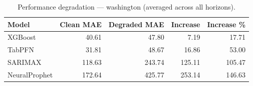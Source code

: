 \begin{table}[h]
\centering
\caption{Performance degradation — washington (averaged across all horizons).}
\label{tab:degradation_summary_washington}
\begin{tabular}{lrrrr}
\toprule
Model & Clean MAE & Degraded MAE & Increase & Increase \% \\
\midrule
XGBoost & 40.61 & 47.80 & 7.19 & 17.71 \\
TabPFN & 31.81 & 48.67 & 16.86 & 53.00 \\
SARIMAX & 118.63 & 243.74 & 125.11 & 105.47 \\
NeuralProphet & 172.64 & 425.77 & 253.14 & 146.63 \\
\bottomrule
\end{tabular}
\end{table}
